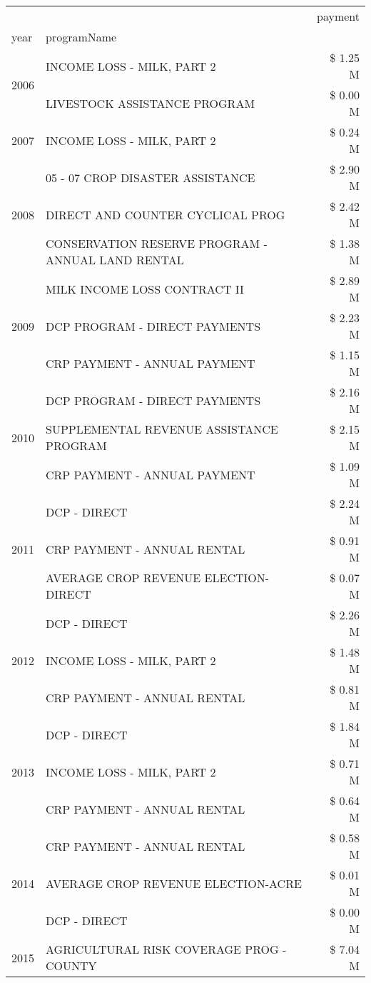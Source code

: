 \begin{tabular}{llr}
\toprule
 &  & payment \\
year & programName &  \\
\midrule
\multirow[t]{2}{*}{2006} & INCOME LOSS - MILK, PART 2 & \$ 1.25 M \\
 & LIVESTOCK ASSISTANCE PROGRAM & \$ 0.00 M \\
\cline{1-3}
2007 & INCOME LOSS - MILK, PART 2 & \$ 0.24 M \\
\cline{1-3}
\multirow[t]{3}{*}{2008} & 05 - 07 CROP DISASTER ASSISTANCE & \$ 2.90 M \\
 & DIRECT AND COUNTER CYCLICAL PROG & \$ 2.42 M \\
 & CONSERVATION RESERVE PROGRAM - ANNUAL LAND RENTAL & \$ 1.38 M \\
\cline{1-3}
\multirow[t]{3}{*}{2009} & MILK INCOME LOSS CONTRACT II & \$ 2.89 M \\
 & DCP PROGRAM - DIRECT PAYMENTS & \$ 2.23 M \\
 & CRP PAYMENT - ANNUAL PAYMENT & \$ 1.15 M \\
\cline{1-3}
\multirow[t]{3}{*}{2010} & DCP PROGRAM - DIRECT PAYMENTS & \$ 2.16 M \\
 & SUPPLEMENTAL REVENUE ASSISTANCE PROGRAM & \$ 2.15 M \\
 & CRP PAYMENT - ANNUAL PAYMENT & \$ 1.09 M \\
\cline{1-3}
\multirow[t]{3}{*}{2011} & DCP - DIRECT & \$ 2.24 M \\
 & CRP PAYMENT - ANNUAL RENTAL & \$ 0.91 M \\
 & AVERAGE CROP REVENUE ELECTION-DIRECT & \$ 0.07 M \\
\cline{1-3}
\multirow[t]{3}{*}{2012} & DCP - DIRECT & \$ 2.26 M \\
 & INCOME LOSS - MILK, PART 2 & \$ 1.48 M \\
 & CRP PAYMENT - ANNUAL RENTAL & \$ 0.81 M \\
\cline{1-3}
\multirow[t]{3}{*}{2013} & DCP - DIRECT & \$ 1.84 M \\
 & INCOME LOSS - MILK, PART 2 & \$ 0.71 M \\
 & CRP PAYMENT - ANNUAL RENTAL & \$ 0.64 M \\
\cline{1-3}
\multirow[t]{3}{*}{2014} & CRP PAYMENT - ANNUAL RENTAL & \$ 0.58 M \\
 & AVERAGE CROP REVENUE ELECTION-ACRE & \$ 0.01 M \\
 & DCP - DIRECT & \$ 0.00 M \\
\cline{1-3}
\multirow[t]{3}{*}{2015} & AGRICULTURAL RISK COVERAGE PROG - COUNTY & \$ 7.04 M \\

\end{tabular}
